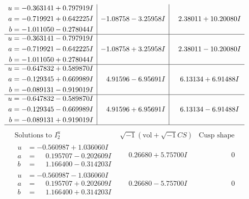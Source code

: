 \documentclass[1p]{elsarticle_modified}
\theoremstyle{definition}
\newcommand{\I}{\sqrt{-1}}
\begin{document}
$$\begin{array}{c|c|c}
\begin{aligned}
u &= -0.363141 + 0.797919 I \\
a &= -0.719921 + 0.642225 I \\
b &= -1.011050 - 0.278044 I\end{aligned}
 & -1.08758 - 3.25958 I & \phantom{-}2.38011 + 10.20080 I \\ \hline\begin{aligned}
u &= -0.363141 - 0.797919 I \\
a &= -0.719921 - 0.642225 I \\
b &= -1.011050 + 0.278044 I\end{aligned}
 & -1.08758 + 3.25958 I & \phantom{-}2.38011 - 10.20080 I \\ \hline\begin{aligned}
u &= -0.647832 + 0.589870 I \\
a &= -0.129345 + 0.669989 I \\
b &= -0.089131 - 0.919019 I\end{aligned}
 & \phantom{-}4.91596 - 6.95691 I & \phantom{-}6.13134 + 6.91488 I \\ \hline\begin{aligned}
u &= -0.647832 - 0.589870 I \\
a &= -0.129345 - 0.669989 I \\
b &= -0.089131 + 0.919019 I\end{aligned}
 & \phantom{-}4.91596 + 6.95691 I & \phantom{-}6.13134 - 6.91488 I\\
 \hline 
 \end{array}$$\newpage$$\begin{array}{c|c|c}  
\text{Solutions to }I^u_{2}& \I (\text{vol} + \sqrt{-1}CS) & \text{Cusp shape}\\
 \hline 
\begin{aligned}
u &= -0.560987 + 1.036060 I \\
a &= \phantom{-}0.195707 - 0.202609 I \\
b &= \phantom{-}1.166400 - 0.314203 I\end{aligned}
 & \phantom{-}0.26680 + 5.75700 I & \phantom{-0.000000 } 0 \\ \hline\begin{aligned}
u &= -0.560987 - 1.036060 I \\
a &= \phantom{-}0.195707 + 0.202609 I \\
b &= \phantom{-}1.166400 + 0.314203 I\end{aligned}
 & \phantom{-}0.26680 - 5.75700 I & \phantom{-0.000000 } 0 \\ \hline\begin{aligned}

\end{aligned}
\end{array}$$
\end{document}
